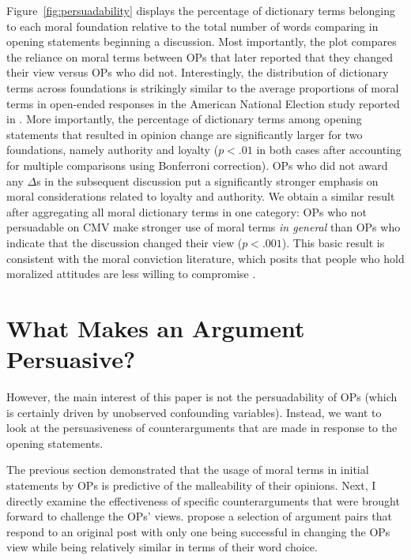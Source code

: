 Figure~\ref{fig:persuadability} displays the percentage of dictionary terms belonging to each moral foundation relative to the total number of words comparing in opening statements beginning a discussion. Most importantly, the plot compares the reliance on moral terms between OPs that later reported that they changed their view versus OPs who did not. Interestingly, the distribution of dictionary terms across foundations is strikingly similar to the average proportions of moral terms in open-ended responses in the American National Election study reported in \citet{kraft2018measuring}. More importantly, the percentage of dictionary terms among opening statements that resulted in opinion change are significantly larger for two foundations, namely authority and loyalty ($p<.01$ in both cases after accounting for multiple comparisons using Bonferroni correction). OPs who did not award any $\Delta$s in the subsequent discussion put a significantly stronger emphasis on moral considerations related to loyalty and authority. We obtain a similar result after aggregating all moral dictionary terms in one category: OPs who not persuadable on CMV make stronger use of moral terms \textit{in general} than OPs who indicate that the discussion changed their view ($p<.001$). This basic result is consistent with the moral conviction literature, which posits that people who hold moralized attitudes are less willing to compromise \citep[e.g.,][]{skitka2005moral,ryan2014reconsidering,ryan2017no}.


\section{What Makes an Argument Persuasive?}



However, the main interest of this paper is not the persuadability of OPs (which is certainly driven by unobserved confounding variables). Instead, we want to look at the persuasiveness of counterarguments that are made in response to the opening statements.

The previous section demonstrated that the usage of moral terms in initial statements by OPs is predictive of the malleability of their opinions. Next, I directly examine the effectiveness of specific counterarguments that were brought forward to challenge the OPs' views. \citet{tan2016winning} propose a selection of argument pairs that respond to an original post with only one being successful in changing the OPs view while being relatively similar in terms of their word choice.

